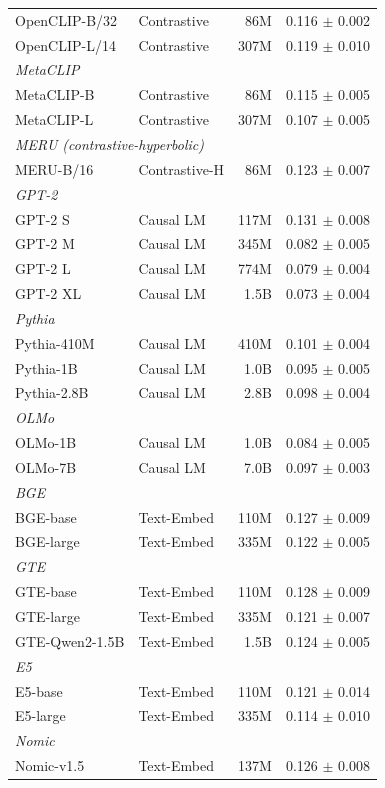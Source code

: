 \begin{table}[t]
\begin{tabular}{llrr}
OpenCLIP-B/32 & Contrastive & 86M & 0.116 $\pm$ 0.002 \\
OpenCLIP-L/14 & Contrastive & 307M & 0.119 $\pm$ 0.010 \\
\midrule
\multicolumn{4}{l}{\emph{MetaCLIP}} \\
MetaCLIP-B & Contrastive & 86M & 0.115 $\pm$ 0.005 \\
MetaCLIP-L & Contrastive & 307M & 0.107 $\pm$ 0.005 \\
\midrule
\multicolumn{4}{l}{\emph{MERU (contrastive-hyperbolic)}} \\
MERU-B/16 & Contrastive-H & 86M & 0.123 $\pm$ 0.007 \\
\midrule
\multicolumn{4}{l}{\emph{GPT-2}} \\
GPT-2 S & Causal LM & 117M & 0.131 $\pm$ 0.008 \\
GPT-2 M & Causal LM & 345M & 0.082 $\pm$ 0.005 \\
GPT-2 L & Causal LM & 774M & 0.079 $\pm$ 0.004 \\
GPT-2 XL & Causal LM & 1.5B & 0.073 $\pm$ 0.004 \\
\midrule
\multicolumn{4}{l}{\emph{Pythia}} \\
Pythia-410M & Causal LM & 410M & 0.101 $\pm$ 0.004 \\
Pythia-1B & Causal LM & 1.0B & 0.095 $\pm$ 0.005 \\
Pythia-2.8B & Causal LM & 2.8B & 0.098 $\pm$ 0.004 \\
\midrule
\multicolumn{4}{l}{\emph{OLMo}} \\
OLMo-1B & Causal LM & 1.0B & 0.084 $\pm$ 0.005 \\
OLMo-7B & Causal LM & 7.0B & 0.097 $\pm$ 0.003 \\
\midrule
\multicolumn{4}{l}{\emph{BGE}} \\
BGE-base & Text-Embed & 110M & 0.127 $\pm$ 0.009 \\
BGE-large & Text-Embed & 335M & 0.122 $\pm$ 0.005 \\
\midrule
\multicolumn{4}{l}{\emph{GTE}} \\
GTE-base & Text-Embed & 110M & 0.128 $\pm$ 0.009 \\
GTE-large & Text-Embed & 335M & 0.121 $\pm$ 0.007 \\
GTE-Qwen2-1.5B & Text-Embed & 1.5B & 0.124 $\pm$ 0.005 \\
\midrule
\multicolumn{4}{l}{\emph{E5}} \\
E5-base & Text-Embed & 110M & 0.121 $\pm$ 0.014 \\
E5-large & Text-Embed & 335M & 0.114 $\pm$ 0.010 \\
\midrule
\multicolumn{4}{l}{\emph{Nomic}} \\
Nomic-v1.5 & Text-Embed & 137M & 0.126 $\pm$ 0.008 \\
\bottomrule
\end{tabular}
\end{table}
